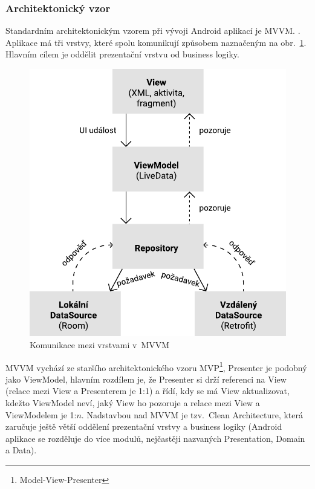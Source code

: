 \documentclass[twoside]{ctuthesis}
\begin{document}
\subsubsection{Architektonický vzor}
Standardním architektonickým vzorem při vývoji Android aplikací je MVVM. \cite{android2020guide}. Aplikace má tři vrstvy, které spolu komunikují způsobem naznačeným na obr.~\ref{fig:mvvm}. Hlavním cílem je oddělit prezentační vrstvu od business logiky.  \cite{shekhar2020mvvm}

\begin{figure}[h!]
	\includegraphics[scale=0.7]{img/mvvm-architecture.pdf}
	\caption{Komunikace mezi vrstvami v~MVVM}
	\label{fig:mvvm}
\end{figure}

MVVM vychází ze staršího architektonického vzoru MVP\footnote{Model-View-Presenter}, Presenter je podobný jako ViewModel, hlavním rozdílem je, že Presenter si drží referenci na View (relace mezi View a Presenterem je 1:1) a řídí, kdy se má View aktualizovat, kdežto ViewModel neví, jaký View ho pozoruje a relace mezi View a ViewModelem je 1:$n$. \cite{vogel2017android} Nadstavbou nad MVVM je tzv.~Clean Architecture, která zaručuje ještě větší oddělení prezentační vrstvy a business logiky (Android aplikace se rozděluje do více modulů, nejčastěji nazvaných Presentation, Domain a Data). \cite{jain2019kotlin}
\end{document}

